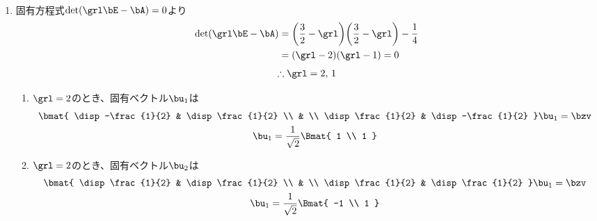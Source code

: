 \begin{ans*}
  ${}$
  \begin{enumerate}[label=(\arabic*)]
    \item 固有方程式$\det(\grl\bE - \bA)=0$より
    \begin{align}
      \det(\grl\bE - \bA)
      &= \biggl(\frac{3}{2} - \grl\biggr)\biggl(\frac{3}{2} - \grl\biggr) - \frac{1}{4} \\
      &= (\grl - 2)(\grl - 1) = 0
    \end{align}
    \begin{gather}
      \therefore \grl = 2,\,1
    \end{gather}
    \begin{enumerate}[label=(\roman*)]
      \item $\grl = 2$のとき、固有ベクトル$\bu_1$は
      \begin{gather}
        \bmat{
          \disp -\frac{1}{2} & \disp\frac{1}{2} \\
          & \\
          \disp \frac{1}{2} & \disp -\frac{1}{2}
        }\bu_1 = \bzv \\
        \bu_1 = \frac{1}{\sqrt{2}}\Bmat{
          1 \\ 1
        }
      \end{gather}
      \item $\grl = 2$のとき、固有ベクトル$\bu_2$は
      \begin{gather}
        \bmat{
          \disp \frac{1}{2} & \disp \frac{1}{2} \\
          & \\
          \disp \frac{1}{2} & \disp \frac{1}{2}
        }\bu_1 = \bzv \\
        \bu_1 = \frac{1}{\sqrt{2}}\Bmat{
          -1 \\ 1
}
\end{gather}
\end{enumerate}
\end{enumerate}
\end{ans*}

